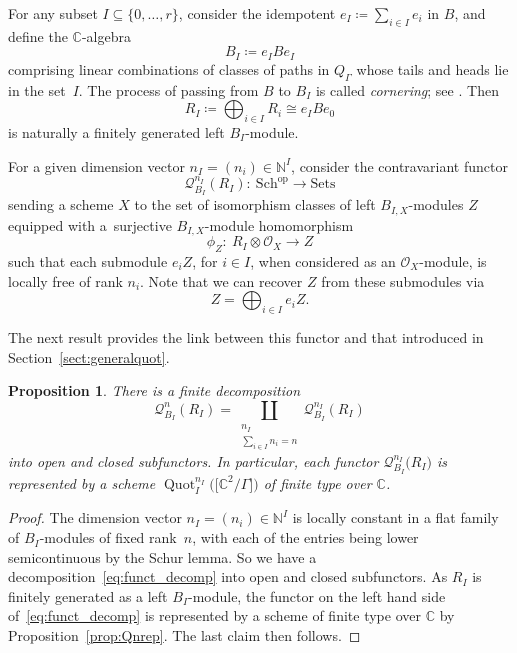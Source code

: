\documentclass[pdftex]{sigma}%
\newtheorem{Proposition}[Theorem]{Proposition}
 { \theoremstyle{definition}
\newtheorem{Definition}[Theorem]{Definition}
\newtheorem{Example}[Theorem]{Example}
\newtheorem{Remark}[Theorem]{Remark}
\newtheorem{remarks}[theorem]{Remarks}
}
\newcommand{\SC}{\mathbb{C}} %
\newcommand{\PiGamma}{B}
\DeclareMathOperator{\Quot}{\mathrm{Quot}}
\newcommand{\QuotI}[1][ ]{\Quot_I^{#1}}
\newcommand{\QuotInI}{\QuotI[n_I]}
\numberwithin{equation}{section}
\begin{document}
For any subset $I \subseteq \{0,\dots,r\}$,
consider the idempotent
$e_I\coloneqq\sum_{i \in I} e_i$ in $B$,
and define the $\SC$-algebra
\begin{equation} \label{eqn:BI}
\PiGamma_I\coloneqq e_I \PiGamma e_I \end{equation}
comprising linear combinations of
classes of paths in $Q_\Gamma$ whose tails and heads lie in the set~$I$. The process of passing
from $\PiGamma$ to $\PiGamma_I$ is called \emph{cornering}; see \cite[Remark 3.1]{craw2018multigraded}.
Then \[ R_I\coloneqq\bigoplus_{i \in I} R_i \cong e_I \PiGamma e_0\] is naturally a finitely generated left $\PiGamma_I$-module.

For a given dimension vector $n_I=(n_i) \in \mathbb{N}^{I}$,
consider the contravariant functor
\[
\mathcal{Q}^{n_I}_{\PiGamma_I}(R_I)\colon \ \mathrm{Sch}^{\mathrm{op}} \to \mathrm{Sets} \]
sending a scheme $X$ to the set of isomorphism classes of left $\PiGamma_{I,X}$-modules $Z$ equipped with a~surjective $\PiGamma_{I,X}$-module homomorphism
\[
\phi_Z\colon \ R_I
\otimes \mathcal{O}_X \to Z
\]
such that each submodule $e_iZ$, {for $i\in I$,}
when considered as an $\mathcal O_{X}$-module, is locally free of rank $n_i$. Note that we can recover $Z$ from these submodules via
\begin{equation*}
Z=\bigoplus_{i\in I} e_i Z.
\end{equation*}

The next result provides the link between this functor and that introduced in Section~\ref{sect:generalquot}.
\begin{Proposition} There is a finite decomposition
\begin{equation}\mathcal{Q}^{n}_{\PiGamma_I}(R_I)=\coprod_{\substack{n_I\\ \sum_{i \in I} n_i =n}} \mathcal{Q}^{n_I}_{\PiGamma_I}(R_I)
\label{eq:funct_decomp}\end{equation}
into open and closed subfunctors.
In particular, each functor
$\mathcal{Q}^{n_I}_{\PiGamma_I}\big(R_I\big)$ is represented by a scheme $\QuotInI\big(\big[\SC^2/\Gamma\big]\big)$ of finite type over $\SC$.
\end{Proposition}
\begin{proof} The dimension vector $n_I=(n_i) \in \mathbb{N}^{I}$ is locally constant in a flat family of $\PiGamma_I$-modules of fixed rank~$n$, with each of the entries being lower semicontinuous by the Schur lemma.
So we have a decomposition~\eqref{eq:funct_decomp} into open and closed subfunctors.
As $R_I$ is finitely generated as a left $B_I$-module, the functor on the left hand side of~\eqref{eq:funct_decomp} is represented by a scheme of finite type over $\SC$ by Proposition~\ref{prop:Qnrep}. The last claim then follows.
\end{proof}
\end{document}
